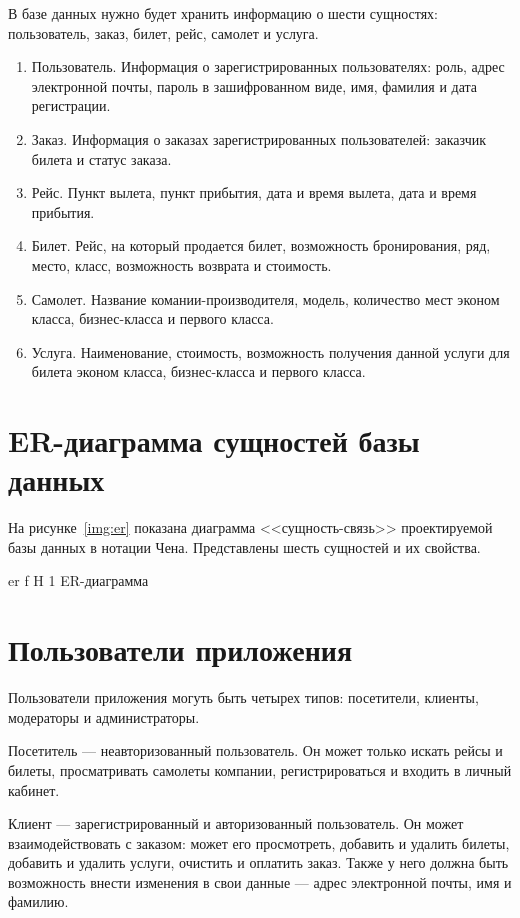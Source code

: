\documentclass{bmstu}
\begin{document}
В базе данных нужно будет хранить информацию о шести сущностях: пользователь, заказ, билет, рейс, самолет и услуга.
\begin{enumerate}
\item Пользователь. 
Информация о зарегистрированных пользователях: роль, адрес электронной почты, пароль в зашифрованном виде, имя, фамилия и дата регистрации.
\item Заказ. 
Информация о заказах зарегистрированных пользователей: заказчик билета и статус заказа.
\item Рейс. 
Пункт вылета, пункт прибытия, дата и время вылета, дата и время прибытия.
\item Билет.
Рейс, на который продается билет, возможность бронирования, ряд, место, класс, возможность возврата и стоимость. 
\item Самолет. 
Название комании-производителя, модель, количество мест эконом класса, бизнес-класса и первого класса.
\item Услуга. 
Наименование, стоимость, возможность получения данной услуги для билета эконом класса, бизнес-класса и первого класса.
\end{enumerate}

\section{ER-диаграмма сущностей базы данных}

На рисунке~\ref{img:er} показана диаграмма <<сущность-связь>> проектируемой базы данных в нотации Чена. 
Представлены шесть сущностей и их свойства.

    {er}
    {f}
    {H}
    {1\textwidth}
    {ER-диаграмма}
    
\section{Пользователи приложения}

Пользователи приложения могуть быть четырех типов: посетители, клиенты, модераторы и администраторы.

Посетитель --- неавторизованный пользователь. 
Он может только искать рейсы и билеты, просматривать самолеты компании, регистрироваться и входить в личный кабинет.

Клиент --- зарегистрированный и авторизованный пользователь. 
Он может взаимодействовать с заказом: может его просмотреть, добавить и удалить билеты, добавить и удалить услуги, очистить и оплатить заказ. 
Также у него должна быть возможность внести изменения в свои данные --- адрес электронной почты, имя и фамилию. 
\end{document}
